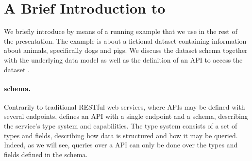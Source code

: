 \section{A Brief Introduction to \gql}\label{sec:bg}


We briefly introduce \gql by means of a running example  that we use in
the rest of the presentation.
The example is about a fictional
dataset \goodbois containing information about animals, specifically
dogs and pigs. We discuss the dataset schema together with the
underlying data model as well as the definition of an API to access
the dataset .  %



\paragraph{\gql schema.}

Contrarily to traditional RESTful web services, where APIs may be defined with several endpoints, 
\gql defines an API with a single endpoint and a schema, describing the service's type system and capabilities.
The type system consists of a set of types and fields, describing how data is structured and how it may be queried.
Indeed, as we will see, queries over a \gql API can only be done over
the types and fields defined in the schema.

